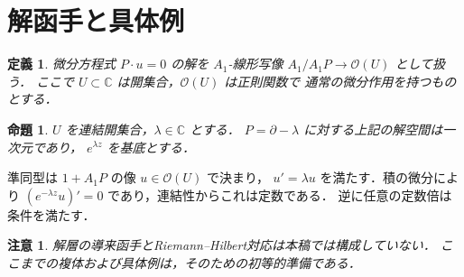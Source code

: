 \documentclass[a5paper,10pt,onecolumn]{jsarticle}
\makeatletter
\theoremstyle{mathnotetheorem}
\newtheorem{definition}[theorem]{定義}
\newtheorem{proposition}[theorem]{命題}
\newtheorem{remark}[theorem]{注意}
\renewcommand{\proofname}{証明}
\renewenvironment{proof}[1][\proofname]{%
  \par\pushQED{\qed}\normalfont\topsep4\p@\@plus2\p@\relax
  \trivlist\item[\hskip\labelsep\bfseries #1]\ignorespaces
}{\popQED\endtrivlist\@endpefalse}
\makeatother
\begin{document}
\section{解函手と具体例}
\begin{definition}
微分方程式 $P\cdot u=0$ の解を $A_1$-線形写像
$A_1/A_1P\to\mathcal O(U)$ として扱う．
ここで $U\subset\mathbb C$ は開集合，$\mathcal O(U)$ は正則関数で
通常の微分作用を持つものとする．
\end{definition}
\begin{proposition}
$U$ を連結開集合，$\lambda\in\mathbb C$ とする．
$P=\partial-\lambda$ に対する上記の解空間は一次元であり，
$e^{\lambda z}$ を基底とする．
\end{proposition}
\begin{proof}
準同型は $1+A_1P$ の像 $u\in\mathcal O(U)$ で決まり，
$u'=\lambda u$ を満たす．積の微分により
$(e^{-\lambda z}u)'=0$ であり，連結性からこれは定数である．
逆に任意の定数倍は条件を満たす．
\end{proof}
\begin{remark}
解層の導来函手とRiemann--Hilbert対応は本稿では構成していない．
ここまでの複体および具体例は，そのための初等的準備である．
\end{remark}
\end{document}

